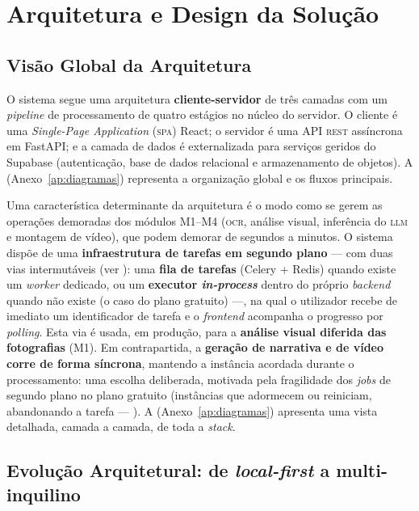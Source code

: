 \chapter{Arquitetura e Design da Solução}
\label{cap:arquitetura}

\section{Visão Global da Arquitetura}
\label{sec:visao_global}

O sistema segue uma arquitetura \textbf{cliente-servidor} de três camadas
com um \emph{pipeline} de processamento de quatro estágios no núcleo do
servidor. O cliente é uma \emph{Single-Page Application} (\textsc{spa})
React; o servidor é uma API \textsc{rest} assíncrona em FastAPI; e a
camada de dados é externalizada para serviços geridos do Supabase
(autenticação, base de dados relacional e armazenamento de objetos). A
 (Anexo~\ref{ap:diagramas}) representa a organização
global e os fluxos principais.

Uma característica determinante da arquitetura é o modo como se gerem as
operações demoradas dos módulos M1--M4 (\textsc{ocr}, análise visual,
inferência do \textsc{llm} e montagem de vídeo), que podem demorar de
segundos a minutos. O sistema dispõe de uma \textbf{infraestrutura de
tarefas em segundo plano} --- com duas vias intermutáveis (ver
): uma \textbf{fila de tarefas} (Celery + Redis) quando
existe um \emph{worker} dedicado, ou um \textbf{executor \emph{in-process}}
dentro do próprio \emph{backend} quando não existe (o caso do plano
gratuito) ---, na qual o utilizador recebe de imediato um identificador de
tarefa e o \emph{frontend} acompanha o progresso por \emph{polling}. Esta
via é usada, em produção, para a \textbf{análise visual diferida das
fotografias} (M1). Em contrapartida, a \textbf{geração de narrativa e de
vídeo corre de forma síncrona}, mantendo a instância acordada durante o
processamento: uma escolha deliberada, motivada pela fragilidade dos
\emph{jobs} de segundo plano no plano gratuito (instâncias que adormecem ou
reiniciam, abandonando a tarefa --- ). A
 (Anexo~\ref{ap:diagramas}) apresenta uma vista
detalhada, camada a camada, de toda a \emph{stack}.

\section{Evolução Arquitetural: de \emph{local-first} a multi-inquilino}
\label{sec:evolucao}

